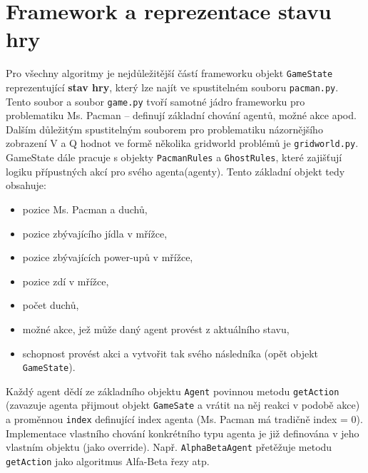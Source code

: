\section{Framework a reprezentace stavu hry}
Pro všechny algoritmy je nejdůležitější částí frameworku objekt \texttt{GameState} reprezentující \textbf{stav hry}, který lze najít ve spustitelném souboru \texttt{pacman.py}. Tento soubor a soubor \texttt{game.py} tvoří samotné jádro frameworku pro problematiku Ms. Pacman -- definují základní chování agentů, možné akce apod.
Dalším důležitým spustitelným souborem pro problematiku názornějšího zobrazení V a Q hodnot ve formě několika gridworld problémů je \texttt{gridworld.py}.
GameState dále pracuje s objekty \texttt{PacmanRules} a \texttt{GhostRules}, které zajišťují logiku přípustných akcí pro svého agenta(agenty).
Tento základní objekt tedy obsahuje:
\begin{itemize}
\item pozice Ms. Pacman a duchů,
\item pozice zbývajícího jídla v mřížce,
\item pozice zbývajících power-upů v mřížce,
\item pozice zdí v mřížce,
\item počet duchů,
\item možné akce, jež může daný agent provést z aktuálního stavu,
\item schopnost provést akci a vytvořit tak svého následníka (opět objekt \texttt{GameState}).
\end{itemize}
Každý agent dědí ze základního objektu \texttt{Agent} povinnou metodu \texttt{getAction} (zavazuje agenta přijmout objekt \texttt{GameSate} a vrátit na něj reakci v podobě akce) a proměnnou \texttt{index} definující index agenta (Ms. Pacman má tradičně index = 0).
Implementace vlastního chování konkrétního typu agenta je již definována v jeho vlastním objektu (jako override). Např. \texttt{AlphaBetaAgent} přetěžuje metodu \texttt{getAction} jako algoritmus Alfa-Beta řezy atp.

